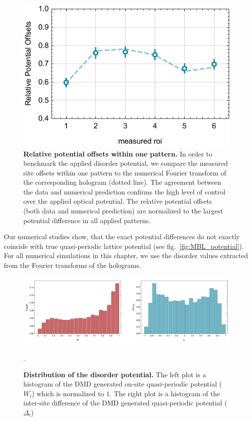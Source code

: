 \begin{figure}[t]
	\centering
	\includegraphics{figures/MBL_disorder_cal_roi.pdf}
	\caption{\label{fig:roi_cal} \textbf {Relative potential offsets within one pattern.} In order to benchmark the applied disorder potential, we compare the measured site offsets within one pattern to the numerical Fourier transform of the corresponding hologram (dotted line). The agreement between the data and numerical prediction confirms the high level of control over the applied optical potential. The relative potential offsets (both data and numerical prediction) are normalized to the largest potential difference in all applied patterns.}
\end{figure}

Our numerical studies show, that the exact potential differences do not exactly coincide with true quasi-periodic lattice potential (see fig.~\ref{fig:MBL_potential}). For all numerical simulations in this chapter, we use the disorder values extracted from the Fourier transforms of the holograms.

\begin{figure}[t]
	\centering
	\includegraphics[width=140mm]{figures/MBL_dists_combo.pdf}
	\caption{\label{fig:DistRow} {\bf Distribution of the disorder potential.}  The left plot is a histogram of the DMD generated on-site quasi-periodic potential ($W_i$) which is normalized to $1$. The right plot is a histogram of the inter-site difference of the DMD generated quasi-periodic potential ($\Delta_i$)  }.
\end{figure}

